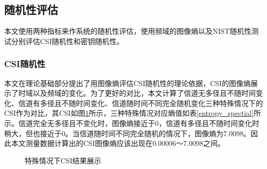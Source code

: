 \documentclass[master]{seuthesis} %
\begin{document}
\begin{Main}
\subsection{随机性评估}

本文使用两种指标来作系统的随机性评估，使用频域的图像熵以及NIST随机性测试分别评估CSI随机性和密钥随机性。

\subsubsection{CSI随机性}

本文在理论基础部分提出了用图像熵评估CSI随机性的理论依据，CSI的图像熵展示了时域以及频域的变化。为了更好的对比，本文计算了信道无多径且不随时间变化、信道有多径且不随时间变化、信道随时间不同完全随机变化三种特殊情况下的CSI作为对比，其CSI如图\ref{special_csi}所示，三种特殊情况对应熵值如表\ref{entropy_spectial}所示。信道完全无多径且不变化时，图像熵接近于0，信道有多径且不随时间变化时稍大，但也接近于0。当信道随时间不同完全随机的情况下，图像熵为7.0098。因此本文测量数据计算出的CSI图像熵应该出现在0.00006～7.0098之间。

\begin{figure}
    \centering
    \caption{特殊情况下CSI结果展示}{} %
    \label{special_csi}
\end{figure}


\end{Main}
\end{document}
